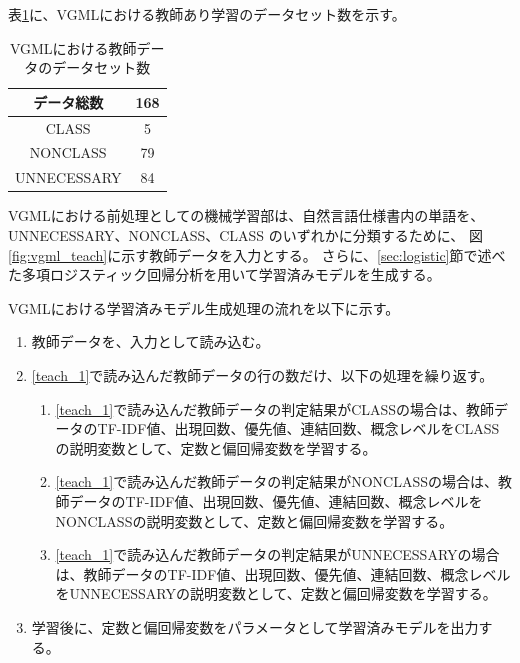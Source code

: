表\ref{table:vgml_data_set}に、VGMLにおける教師あり学習のデータセット数を示す。

\begin{table}[t]
    \begin{center}
      \caption{VGMLにおける教師データのデータセット数}
      \label{table:vgml_data_set}
      \begin{tabular}{c|c}
        データ総数　& 168\\
        \hline
        \hline
        CLASS    & 5\\ \hline
        NONCLASS & 79\\ \hline
        UNNECESSARY   & 84\\ \hline
      \end{tabular}
    \end{center}
  \end{table}

VGMLにおける前処理としての機械学習部は、自然言語仕様書内の単語を、UNNECESSARY、NONCLASS、CLASS のいずれかに分類するために、
図\ref{fig:vgml_teach}に示す教師データを入力とする。
さらに、\ref{sec:logistic}節で述べた多項ロジスティック回帰分析を用いて学習済みモデルを生成する。

VGMLにおける学習済みモデル生成処理の流れを以下に示す。

\begin{enumerate}
	\item 教師データを、入力として読み込む。
    \label{teach_1}
	\item \ref{teach_1}で読み込んだ教師データの行の数だけ、以下の処理を繰り返す。
        \begin{enumerate}
            \item \ref{teach_1}で読み込んだ教師データの判定結果がCLASSの場合は、教師データのTF-IDF値、出現回数、優先値、連結回数、概念レベルをCLASSの説明変数として、定数と偏回帰変数を学習する。
            \item \ref{teach_1}で読み込んだ教師データの判定結果がNONCLASSの場合は、教師データのTF-IDF値、出現回数、優先値、連結回数、概念レベルをNONCLASSの説明変数として、定数と偏回帰変数を学習する。
            \item \ref{teach_1}で読み込んだ教師データの判定結果がUNNECESSARYの場合は、教師データのTF-IDF値、出現回数、優先値、連結回数、概念レベルをUNNECESSARYの説明変数として、定数と偏回帰変数を学習する。
        \end{enumerate}
	\item 学習後に、定数と偏回帰変数をパラメータとして学習済みモデルを出力する。
\end{enumerate}


